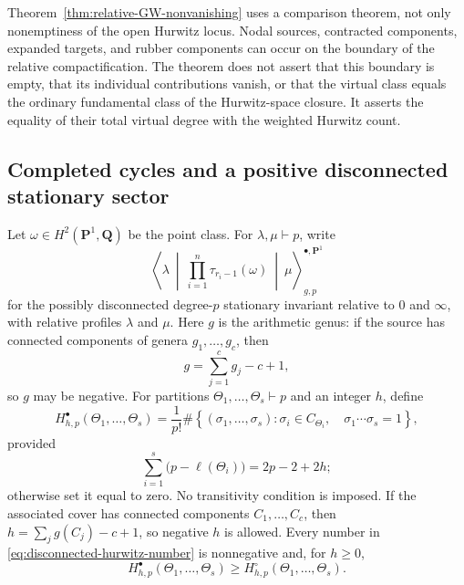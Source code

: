 \documentclass[11pt]{amsart}
\theoremstyle{plain}
\theoremstyle{definition}
\numberwithin{equation}{section}
\begin{document}
Theorem~\ref{thm:relative-GW-nonvanishing} uses a comparison theorem, not
only nonemptiness of the open Hurwitz locus.  Nodal sources, contracted
components, expanded targets, and rubber components can occur on the
boundary of the relative compactification.  The theorem does not assert
that this boundary is empty, that its individual contributions vanish, or
that the virtual class equals the ordinary fundamental class of the
Hurwitz-space closure.  It asserts the equality of their total virtual
degree with the weighted Hurwitz count.

\subsection{Completed cycles and a positive disconnected stationary sector}

Let $\omega\in H^2(\mathbf P^1,\mathbf Q)$ be the point class.  For
$\lambda,\mu\vdash p$, write
\[
 \left\langle\lambda\ \middle|\
   \prod_{i=1}^n\tau_{r_i-1}(\omega)\
   \middle|\ \mu\right\rangle^{\bullet,\mathbf P^1}_{g,p}
\]
for the possibly disconnected degree-$p$ stationary invariant relative to
$0$ and $\infty$, with relative profiles $\lambda$ and $\mu$.  Here $g$ is
the arithmetic genus: if the source has connected components of genera
$g_1,\ldots,g_c$, then
\[
 g=\sum_{j=1}^c g_j-c+1,
\]
so $g$ may be negative.  For partitions
$\Theta_1,\ldots,\Theta_s\vdash p$ and an integer $h$, define
\begin{equation}\label{eq:disconnected-hurwitz-number}
 H^\bullet_{h,p}(\Theta_1,\ldots,\Theta_s)
 =\frac1{p!}\#\left\{(\sigma_1,\ldots,\sigma_s):
  \sigma_i\in C_{\Theta_i},\quad
  \sigma_1\cdots\sigma_s=1\right\},
\end{equation}
provided
\begin{equation}\label{eq:disconnected-hurwitz-RH}
 \sum_{i=1}^s\bigl(p-\ell(\Theta_i)\bigr)=2p-2+2h;
\end{equation}
otherwise set it equal to zero.  No transitivity condition is imposed.
If the associated cover has connected components $C_1,\ldots,C_c$, then
$h=\sum_jg(C_j)-c+1$, so negative $h$ is allowed.  Every number in
\eqref{eq:disconnected-hurwitz-number} is nonnegative and, for $h\geq0$,
\begin{equation}\label{eq:connected-contained-in-disconnected}
 H^\bullet_{h,p}(\Theta_1,\ldots,\Theta_s)
 \geq H^\circ_{h,p}(\Theta_1,\ldots,\Theta_s).
\end{equation}
\end{document}
